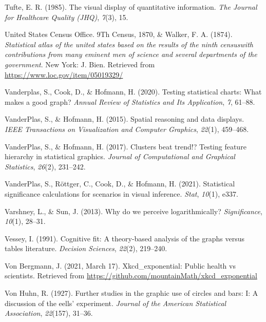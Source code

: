 \documentclass[print]{nuthesis}
\newlength{\cslhangindent}
\newenvironment{CSLReferences}[2]%
{\setlength{\parindent}{0pt}%
\everypar{\setlength{\hangindent}{\cslhangindent}}\ignorespaces}%
{\par}
\begin{document}
\begin{CSLReferences}{1}{0}
\leavevmode{}%
Tufte, E. R. (1985). The visual display of quantitative information. \emph{The Journal for Healthcare Quality (JHQ)}, \emph{7}(3), 15.

\leavevmode{}%
United States Census Office. 9Th Census, 1870, \& Walker, F. A. (1874). \emph{Statistical atlas of the united states based on the results of the ninth censuswith contributions from many eminent men of science and several departments of the government}. New York: J. Bien. Retrieved from \url{https://www.loc.gov/item/05019329/}

\leavevmode{}%
Vanderplas, S., Cook, D., \& Hofmann, H. (2020). Testing statistical charts: What makes a good graph? \emph{Annual Review of Statistics and Its Application}, \emph{7}, 61--88.

\leavevmode{}%
VanderPlas, S., \& Hofmann, H. (2015). Spatial reasoning and data displays. \emph{IEEE Transactions on Visualization and Computer Graphics}, \emph{22}(1), 459--468.

\leavevmode{}%
VanderPlas, S., \& Hofmann, H. (2017). Clusters beat trend!? Testing feature hierarchy in statistical graphics. \emph{Journal of Computational and Graphical Statistics}, \emph{26}(2), 231--242.

\leavevmode{}%
VanderPlas, S., Röttger, C., Cook, D., \& Hofmann, H. (2021). Statistical significance calculations for scenarios in visual inference. \emph{Stat}, \emph{10}(1), e337.

\leavevmode{}%
Varshney, L., \& Sun, J. (2013). Why do we perceive logarithmically? \emph{Significance}, \emph{10}(1), 28--31.

\leavevmode{}%
Vessey, I. (1991). Cognitive fit: A theory-based analysis of the graphs versus tables literature. \emph{Decision Sciences}, \emph{22}(2), 219--240.

\leavevmode{}%
Von Bergmann, J. (2021, March 17). Xkcd\_exponential: Public health vs scientists. Retrieved from \url{https://github.com/mountainMath/xkcd_exponential}

\leavevmode{}%
Von Huhn, R. (1927). Further studies in the graphic use of circles and bars: I: A discussion of the eells' experiment. \emph{Journal of the American Statistical Association}, \emph{22}(157), 31--36.


\end{CSLReferences}
\end{document}

